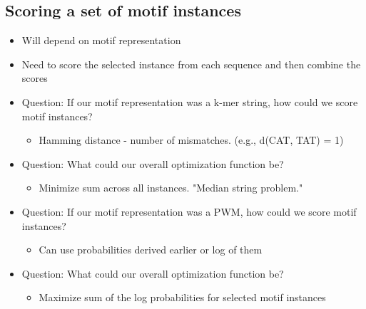 \documentclass[10pt]{article}
\begin{document}
\subsection*{Scoring a set of motif instances}
\begin{itemize}
	\item Will depend on motif representation
	\item Need to score the selected instance from each sequence and then combine the scores
	\item Question: If our motif representation was a k-mer string, how could we score motif instances?
	\begin{itemize}
        \item Hamming distance - number of mismatches.  (e.g., d(CAT, TAT) = 1)
    \end{itemize}
    \item Question: What could our overall optimization function be?
    \begin{itemize}
        \item Minimize sum across all instances.  "Median string problem."
    \end{itemize}
    \item Question: If our motif representation was a PWM, how could we score motif instances?
    \begin{itemize}
        \item Can use probabilities derived earlier or log of them
    \end{itemize}
    \item Question: What could our overall optimization function be?
    \begin{itemize}
        \item Maximize sum of the log probabilities for selected motif instances
    \end{itemize}
\end{itemize}
\end{document}
